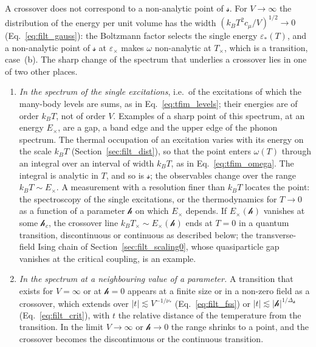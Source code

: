 \documentclass[10pt,a4paper]{article}
\theoremstyle{plain}
\newcommand{\hfield}{\mathscr{h}}  %
\newcommand{\lds}{\mathscr{s}}  %
\begin{document}
A crossover does not correspond to a non-analytic point of $\lds$. For
$V\to\infty$ the distribution of the energy per unit volume has the width
$(k_BT^{2}c_\mu/V)^{1/2}\to0$ (Eq.~\eqref{eq:filt_gauss}): the Boltzmann factor
selects the single energy $\varepsilon_*(T)$, and a non-analytic point of
$\lds$ at $\varepsilon_\times$ makes $\omega$ non-analytic at $T_\times$,
which is a transition, case~(b). The sharp change of the spectrum that
underlies a crossover lies in one of two other places.
\begin{enumerate}[label=(\roman*),itemsep=0pt]
\item \emph{In the spectrum of the single excitations}, i.e.\ of the
  excitations of which the many-body levels are sums, as in
  Eq.~\eqref{eq:tfim_levels}; their energies are of order $k_BT$, not of
  order $V$. Examples of a sharp point of this spectrum, at an energy
  $E_\times$, are a gap, a band edge and the upper edge of the phonon
  spectrum. The thermal occupation of an
  excitation varies with its energy on the scale $k_BT$
  (Section~\ref{sec:filt_dist}), so that the point enters $\omega(T)$
  through an integral over an interval of width $k_BT$, as in
  Eq.~\eqref{eq:tfim_omega}. The integral is analytic in $T$, and so is $\lds$;
  the observables change over the range $k_BT\sim E_\times$. A measurement
  with a resolution finer than $k_BT$ locates the point: the spectroscopy of
  the single excitations, or the thermodynamics for $T\to0$ as a function of
  a parameter $\hfield$ on which $E_\times$ depends. If $E_\times(\hfield)$
  vanishes at some $\hfield_c$, the crossover line
  $k_BT_\times\sim E_\times(\hfield)$ ends at $T=0$ in a quantum transition,
  discontinuous or continuous as described below; the transverse-field
  Ising chain of Section~\ref{sec:filt_scaling0}, whose quasiparticle gap
  vanishes at the critical coupling, is an example.
\item \emph{In the spectrum at a neighbouring value of a parameter.} A
  transition that exists for $V=\infty$ or at $\hfield=0$ appears at a finite
  size or in a non-zero field as a crossover, which extends over
  $|t|\lesssim V^{-1/\nu_*}$ (Eq.~\eqref{eq:filt_fss}) or
  $|t|\lesssim|\hfield|^{1/\Delta_\hfield}$ (Eq.~\eqref{eq:filt_crit}), with
  $t$ the relative distance of the temperature from the transition. In the
  limit $V\to\infty$ or $\hfield\to0$ the range shrinks to a point, and the
  crossover becomes the discontinuous or the continuous transition.
\end{enumerate}
\end{document}
